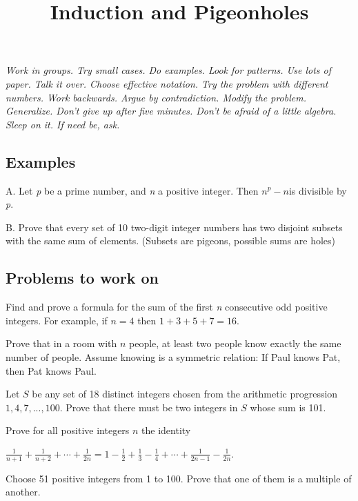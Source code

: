 \documentclass{article}
\begin{document}
\title{Induction and Pigeonholes}
\author{}
\date{}
\maketitle

 \textit{  Work in groups. Try small cases. Do examples. Look for patterns. Use lots of paper. Talk it over. Choose effective
notation. Try the problem with different numbers. Work backwards. Argue by contradiction. Modify the problem. Generalize. Don{'}t give up after five
minutes. Don{'}t be afraid of a little algebra. Sleep on it. { }If need be, ask.}

\subsection*{Examples}

A.  Let \textit{ p} be a prime number, and \textit{ n} a positive integer. Then \(n^p - n\)is divisible by \textit{
p}.

B. { }Prove that every set of 10 two-digit integer numbers has two disjoint subsets with the same sum of elements. { }(Subsets are pigeons, possible
sums are holes)

\subsection*{Problems to work on }



Find and prove a formula for the sum of the first \textit{ n} consecutive odd positive integers. For example, if \(n = 4\) then \(1 + 3 + 5 + 7 =
16\).

Prove that in a room with \(n\) people, at least two people know exactly the same number of people. Assume knowing is a symmetric relation: If Paul
knows Pat, then Pat knows Paul.

Let \(S\) be any set of 18 distinct integers chosen from the arithmetic progression \(1, 4, 7, . . . , 100\). { }Prove that there must be two integers
in \(S\) whose sum is 101.

Prove for all positive integers \(n\) the identity

 \(\frac{1}{n+1}+\frac{1}{n+2}+\cdots +\frac{1}{2n}=1-\frac{1}{2}+\frac{1}{3}-\frac{1}{4}+\cdots +\frac{1}{2n-1}-\frac{1}{2n}\).

Choose 51 positive integers from 1 to 100. Prove that one of them is a multiple of another.
\end{document}
